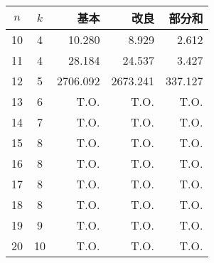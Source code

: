 \centering 
 \begin{tabular}{c|c|r|r|r} %
  $n$ & $k$ & 基本 & 改良 & 部分和 \\ \hline
  10 & 4 & 10.280 & 8.929 & \alert{2.612} \\
  11 & 4 & 28.184 & 24.537 & \alert{3.427} \\
  12 & 5 & 2706.092 & 2673.241 & \alert{337.127} \\
  13 & 6 & T.O. & T.O. & T.O. \\  
  14 & 7 & T.O. & T.O. & T.O. \\   
  15 & 8 & T.O. & T.O. & T.O. \\  
  16 & 8 & T.O. & T.O. & T.O. \\
  17 & 8 & T.O. & T.O. & T.O. \\
  18 & 8 & T.O. & T.O. & T.O. \\
  19 & 9 & T.O. & T.O. & T.O. \\
  20 & 10 & T.O. & T.O. & T.O. \\ %
 \end{tabular}